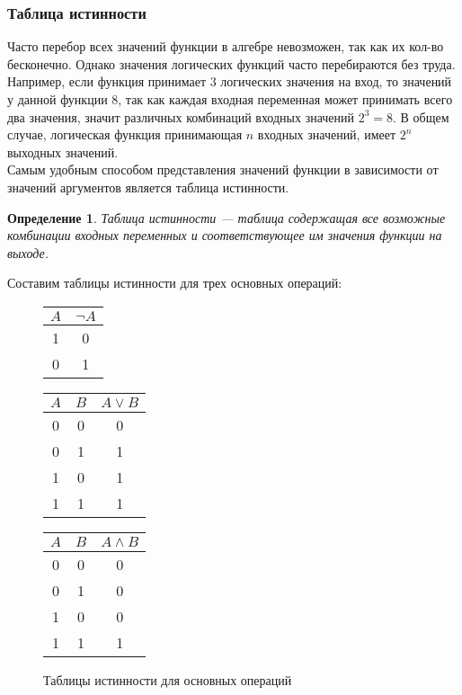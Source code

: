 \documentclass[12pt]{article}
\newtheorem{definition}{Определение}[section]
\theoremstyle{problem_style}
\begin{document}
\subsubsection{Таблица истинности}
Часто перебор всех значений функции в алгебре невозможен, так как их кол-во бесконечно. Однако значения логических функций часто перебираются без труда. Например, если функция принимает 3 логических значения на вход, то значений у данной функции 8, так как каждая входная переменная может принимать всего два значения, значит различных комбинаций входных значений \(2^3 = 8\).
В общем случае, логическая функция принимающая $n$ входных значений, имеет $2^n$ выходных значений.\\
Самым удобным способом представления значений функции в зависимости от значений аргументов является таблица истинности.
\begin{definition}
Таблица истинности — таблица содержащая все возможные комбинации входных переменных и соответствующее им значения функции на выходе.
\end{definition}
Составим таблицы истинности для трех основных операций:
\begin{figure}[h!]
    \centering
    \begin{minipage}{0.3\linewidth}
        \centering
        \begin{tabular}{|c|c|}
        \hline
        $A$ & $\neg A$ \\
        \hline
        1 & 0 \\
        0 & 1 \\
        \hline
        \end{tabular}
    \end{minipage}
    \hspace{0.5cm}
    \begin{minipage}{0.3\linewidth}
        \centering
        \begin{tabular}{|c|c|c|}
        \hline
        $A$ & $B$ & $A \lor B$ \\
        \hline
        0 & 0 & 0 \\
        0 & 1 & 1 \\
        1 & 0 & 1 \\
        1 & 1 & 1 \\
        \hline
        \end{tabular}
    \end{minipage}
    \hspace{0.5cm}
    \begin{minipage}{0.3\linewidth}
        \centering
        \begin{tabular}{|c|c|c|}
        \hline
        $A$ & $B$ & $A \land B$ \\
        \hline
        0 & 0 & 0 \\
        0 & 1 & 0 \\
        1 & 0 & 0 \\
        1 & 1 & 1 \\
        \hline
        \end{tabular}
    \end{minipage}
    \caption{Таблицы истинности для основных операций}
    \label{fig:truth_tables_1}
\end{figure}\\
\end{document}
